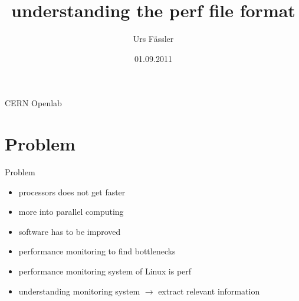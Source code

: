 
\usepackage[utf8]{inputenc}
\usepackage{amsmath}
\usepackage{amsfonts}
\usepackage{amssymb}
\usepackage{multicol}
\usepackage{graphicx}
\usepackage{tikz}
\usetikzlibrary{arrows,positioning,shapes}
\usepackage{listings}
\usepackage{multicol}
\usepackage{appendixnumberbeamer}
\usepackage{pstricks}
\usepackage{marvosym}
\usepackage{biblatex}

\newcommand{\code}[1]{\texttt{#1}}

\title{understanding the perf file format}
\author{Urs F\"assler}
\date{01.09.2011}
\institute
{
  CERN Openlab
}

%


\beamertemplatenavigationsymbolsempty




\begin{frame}[plain]
  \titlepage
\end{frame}

\setcounter{framenumber}{0}

\section{Problem}
\begin{frame}{Problem}
\begin{itemize}
  \item processors does not get faster
  \item more into parallel computing
  \item software has to be improved
\pause
  \item performance monitoring to find bottlenecks
  \item performance monitoring system of Linux is perf
  \item understanding monitoring system $\rightarrow$ extract relevant information
\end{itemize}
\end{frame}

